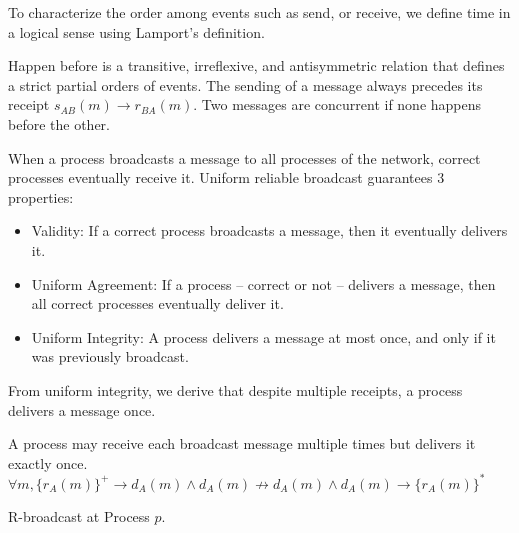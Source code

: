 To characterize the order among events such as send, or receive, we define time
in a logical sense using Lamport’s definition.

\begin{definition}
  Happen before is a transitive, irreflexive, and antisymmetric relation that
  defines a strict partial orders of events. The sending of a message always
  precedes its receipt $s_{AB}(m) \rightarrow r_{BA}(m)$. Two messages are
  concurrent if none happens before the other.
\end{definition}

\begin{definition} 
  When a process broadcasts a message to all processes of the network, correct
  processes eventually receive it. Uniform reliable broadcast guarantees 3
  properties:
  \begin{itemize}
  \item Validity: If a correct process broadcasts a message, then it
    eventually delivers it.
  \item Uniform Agreement: If a process -- correct or not -- delivers a message,
    then all correct processes eventually deliver it.
  \item Uniform Integrity: A process delivers a message at most once, and only if
    it was previously broadcast.
  \end{itemize}
\end{definition}

From uniform integrity, we derive that despite multiple receipts, a process
delivers a message once.

\begin{definition}
  A process may receive each broadcast message multiple times but delivers it
  exactly once.
  $\forall m, \{r_A(m)\}^+ \rightarrow d_A(m) \wedge d_A(m) \not\rightarrow d_A(m) \wedge d_A(m) \rightarrow \{r_A(m)\}^*$
\end{definition}

\begin{algorithm}[h]
  
  \caption{\label{algo:reliablebroadcast}R-broadcast at Process $p$.}
\end{algorithm}

